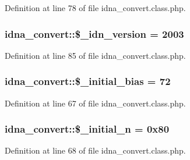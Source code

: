 Definition at line 78 of file idna\-\_\-convert.\-class.\-php.

\hypertarget{classidna__convert_a14edc7c94d7c9c05a8a7eada24901dfd}{
\subsubsection[{\$\-\_\-idn\-\_\-version}]{\setlength{\rightskip}{0pt plus 5cm}idna\-\_\-convert\-::\$\-\_\-idn\-\_\-version = 2003\hspace{0.3cm}{\ttfamily [protected]}}}\label{classidna__convert_a14edc7c94d7c9c05a8a7eada24901dfd}


Definition at line 85 of file idna\-\_\-convert.\-class.\-php.

\hypertarget{classidna__convert_a9baf9ea9ebceee6e4dffb60cce1d20bc}{
\subsubsection[{\$\-\_\-initial\-\_\-bias}]{\setlength{\rightskip}{0pt plus 5cm}idna\-\_\-convert\-::\$\-\_\-initial\-\_\-bias = 72\hspace{0.3cm}{\ttfamily [protected]}}}\label{classidna__convert_a9baf9ea9ebceee6e4dffb60cce1d20bc}


Definition at line 67 of file idna\-\_\-convert.\-class.\-php.

\hypertarget{classidna__convert_a02dd88f575541a67a6312a15af340733}{
\subsubsection[{\$\-\_\-initial\-\_\-n}]{\setlength{\rightskip}{0pt plus 5cm}idna\-\_\-convert\-::\$\-\_\-initial\-\_\-n = 0x80\hspace{0.3cm}{\ttfamily [protected]}}}\label{classidna__convert_a02dd88f575541a67a6312a15af340733}


Definition at line 68 of file idna\-\_\-convert.\-class.\-php.

